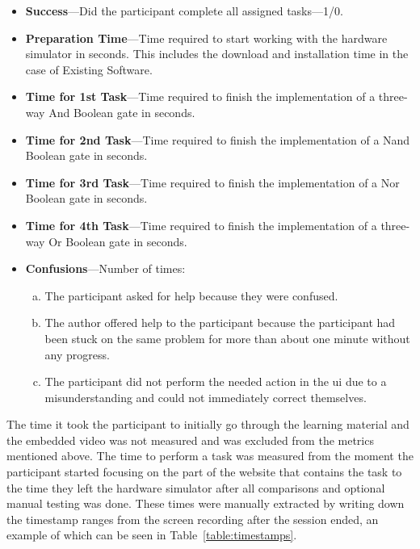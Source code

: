 \begin{itemize}
    \item \textbf{Success}---Did the participant complete all assigned tasks---1/0.
    \item \textbf{Preparation Time}---Time required to start working with the hardware simulator in seconds. This includes the download and installation time in the case of Existing Software.
    \item \textbf{Time for 1st Task}---Time required to finish the implementation of a three-way And Boolean gate in seconds.
    \item \textbf{Time for 2nd Task}---Time required to finish the implementation of a Nand Boolean gate in seconds.
    \item \textbf{Time for 3rd Task}---Time required to finish the implementation of a Nor Boolean gate in seconds.
    \item \textbf{Time for 4th Task}---Time required to finish the implementation of a three-way Or Boolean gate in seconds.
    \item \textbf{Confusions}---Number of times:
    \begin{enumerate}[(a)]
        \item The participant asked for help because they were confused.
        \item The author offered help to the participant because the participant had been stuck on the same problem for more than about one minute without any progress.
        \item The participant did not perform the needed action in the \gls{ui} due to a misunderstanding and could not immediately correct themselves.
    \end{enumerate}
\end{itemize}

The time it took the participant to initially go through the learning material and the embedded video was not measured and was excluded from the metrics mentioned above.
The time to perform a task was measured from the moment the participant started focusing on the part of the website that contains the task to the time they left the hardware simulator after all comparisons and optional manual testing was done.
These times were manually extracted by writing down the timestamp ranges from the screen recording after the session ended, an example of which can be seen in Table~\ref{table:timestamps}.

